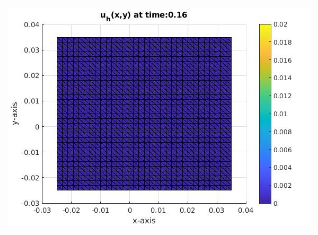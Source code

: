 \documentclass[a4paper,11pt]{article}
\begin{document}
\begin{figure}[h]
\begin{subfigure}{0.4\textwidth}
	\end{subfigure}
	\begin{subfigure}{0.4\textwidth}
		\includegraphics[width =8cm]{./tc1-1/016.jpg}
	\end{subfigure}
\end{figure}
\restoregeometry
\newpage
{} 
\end{document}
